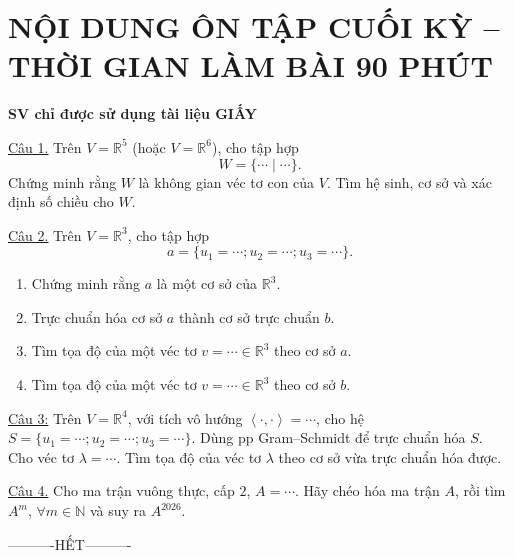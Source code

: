 \documentclass[12pt,a4paper]{article}
\newcommand{\R}{\mathbb{R}}
\newcommand{\N}{\mathbb{N}}
\newcommand{\ip}[2]{\left\langle #1,#2\right\rangle}
\begin{document}
\section*{NỘI DUNG ÔN TẬP CUỐI KỲ -- THỜI GIAN LÀM BÀI 90 PHÚT}
\textbf{SV chỉ được sử dụng tài liệu GIẤY}

\underline{Câu 1.} Trên $V=\R^5$ (hoặc $V=\R^6$), cho tập hợp
\[
W=\{\cdots\mid\cdots\}.
\]
Chứng minh rằng $W$ là không gian véc tơ con của $V$. Tìm hệ sinh, cơ sở và xác định số chiều cho $W$.

\underline{Câu 2.} Trên $V=\R^3$, cho tập hợp
\[
a=\{u_1=\cdots;u_2=\cdots;u_3=\cdots\}.
\]
\begin{enumerate}[label=\alph*/]
\item Chứng minh rằng $a$ là một cơ sở của $\R^3$.
\item Trực chuẩn hóa cơ sở $a$ thành cơ sở trực chuẩn $b$.
\item Tìm tọa độ của một véc tơ $v=\cdots\in\R^3$ theo cơ sở $a$.
\item Tìm tọa độ của một véc tơ $v=\cdots\in\R^3$ theo cơ sở $b$.
\end{enumerate}

\underline{Câu 3:} Trên $V=\R^4$, với tích vô hướng $\ip{\cdot}{\cdot}=\cdots$, cho hệ
$S=\{u_1=\cdots;u_2=\cdots;u_3=\cdots\}$. Dùng pp Gram--Schmidt để trực chuẩn hóa $S$.
Cho véc tơ $\lambda=\cdots$. Tìm tọa độ của véc tơ $\lambda$ theo cơ sở vừa trực chuẩn hóa được.

\underline{Câu 4.} Cho ma trận vuông thực, cấp $2$, $A=\cdots$. Hãy chéo hóa ma trận $A$, rồi tìm $A^m$, $\forall m\in\N$ và suy ra $A^{2026}$.

\begin{center}
----------HẾT----------
\end{center}
\end{document}
